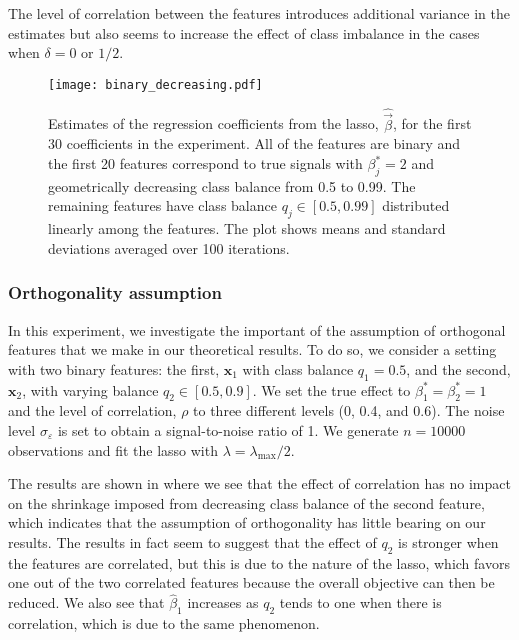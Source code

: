 The level of correlation between the features introduces additional variance in the
estimates but also seems to increase the effect of class imbalance in the cases when
\(\delta = 0\) or \(1/2\).

\begin{figure}[htpb]
  \centering
  \texttt{[image: binary\_decreasing.pdf]}
  \caption{%
    Estimates of the regression coefficients from the lasso, \(\hat{\vec{\beta}}\), for the
    first 30 coefficients in the experiment. All of the features are binary and the first 20
    features correspond to true signals with \(\beta_j^* = 2\) and geometrically decreasing
    class balance from 0.5 to 0.99. The remaining features have class balance \(q_j \in [0.5,
      0.99]\) distributed linearly among the features. The plot shows means and standard
    deviations averaged over 100 iterations.
  }
  \label{fig:binary-decreasing-full}
\end{figure}

\subsubsection{Orthogonality assumption}
\label{sec:orthogonality-assumption}

In this experiment, we investigate the important of the assumption of orthogonal features
that we make in our theoretical results. To do so, we consider a setting with two binary
features: the first, \(\bm{x}_1\) with class balance \(q_1 = 0.5\), and the second,
\(\bm{x}_2\), with varying balance \(q_2 \in [0.5, 0.9]\). We set the true effect to
\(\beta_1^* = \beta_2^* = 1\) and the level of correlation, \(\rho\) to three different
levels (0, 0.4, and 0.6). The noise level \(\sigma_\varepsilon\) is set to obtain a
signal-to-noise ratio of 1. We generate \(n=\num{10000}\) observations and fit the lasso
with \(\lambda = \lambda_\text{max}/2\).

The results are shown in  where we see that the effect of
correlation has no impact on the shrinkage imposed from decreasing class balance of the
second feature, which indicates that the assumption of orthogonality has little bearing on
our results. The results in fact seem to suggest that the effect of \(q_2\) is stronger
when the features are correlated, but this is due to the nature of the lasso, which favors
one out of the two correlated features because the overall objective can then be reduced.
We also see that \(\hat{\beta}_1\) increases as \(q_2\) tends to one when there is
correlation, which is due to the same phenomenon.

